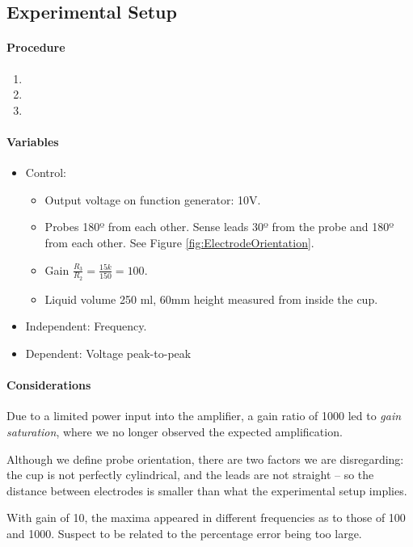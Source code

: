 \subsection{Experimental Setup}
\paragraph{Procedure}
\begin{enumerate}
	\item 
	\item 
	\item 
\end{enumerate}
\paragraph{Variables}
\begin{itemize}
	\item Control:
		\begin{itemize}
			\item Output voltage on function generator: 10V.
			\item Probes 180º from each other. Sense leads 30º from the probe and 180º from each other. See Figure \ref{fig:ElectrodeOrientation}.
			\item Gain $\frac{R_3}{R_2} = \frac{15k}{150} = 100$.
			\item Liquid volume 250 ml, 60mm height measured from inside the cup.
		\end{itemize}
	\item Independent: Frequency.
	\item Dependent: Voltage peak-to-peak
\end{itemize}

\paragraph{Considerations}

Due to a limited power input into the amplifier, a gain ratio of 1000 led to \textit{gain saturation}, where we no longer observed the expected amplification.

Although we define probe orientation, there are two factors we are disregarding: the cup is not perfectly cylindrical, and the leads are not straight -- so the distance between electrodes is smaller than what the experimental setup implies.

With gain of 10, the maxima appeared in different frequencies as to those of 100 and 1000. Suspect to be related to the percentage error being too large.

